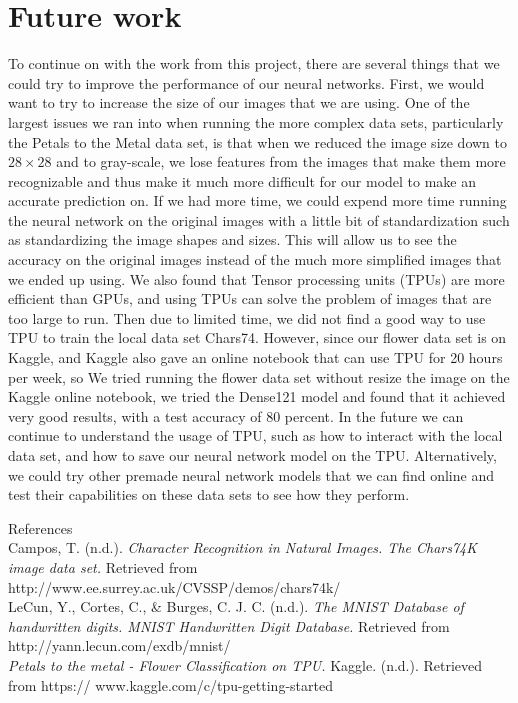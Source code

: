 \documentclass{article}
\begin{document}
\section*{Future work}
To continue on with the work from this project, there are several things that we could try to improve the performance of our neural networks. First, we would want to try to increase the size of our images that we are using. One of the largest issues we ran into when running the more complex data sets, particularly the Petals to the Metal data set, is that when we reduced the image size down to $28\times 28$ and to gray-scale, we lose features from the images that make them more recognizable and thus make it much more difficult for our model to make an accurate prediction on. If we had more time, we could expend more time running the neural network on the original images with a little bit of standardization such as standardizing the image shapes and sizes. This will allow us to see the accuracy on the original images instead of the much more simplified images that we ended up using.  We also found that Tensor processing units (TPUs) are more efficient than GPUs, and using TPUs can solve the problem of images that are too large to run. Then due to limited time, we did not find a good way to use TPU to train the local data set Chars74. However, since our flower data set is on Kaggle, and Kaggle also gave an online notebook that can use TPU for 20 hours per week, so We tried running the flower data set without resize the image on the Kaggle online notebook, we tried the Dense121 model and found that it achieved very good results, with a test accuracy of 80 percent. In the future we can continue to understand the usage of TPU, such as how to interact with the local data set, and how to save our neural network model on the TPU. Alternatively, we could try other premade neural network models that we can find online and test their capabilities on these data sets to see how they perform. 

\pagebreak
References\\

Campos, T. (n.d.). \textit{Character Recognition in Natural Images. The Chars74K image data set.} Retrieved from http://www.ee.surrey.ac.uk/CVSSP/demos/chars74k/\\

LeCun, Y., Cortes, C., \& Burges, C. J. C. (n.d.). \textit{The MNIST Database of handwritten digits. MNIST Handwritten Digit Database.} Retrieved from http://yann.lecun.com/exdb/mnist/\\

\textit{Petals to the metal - Flower Classification on TPU.} Kaggle. (n.d.). Retrieved from https:// www.kaggle.com/c/tpu-getting-started 
\end{document}
